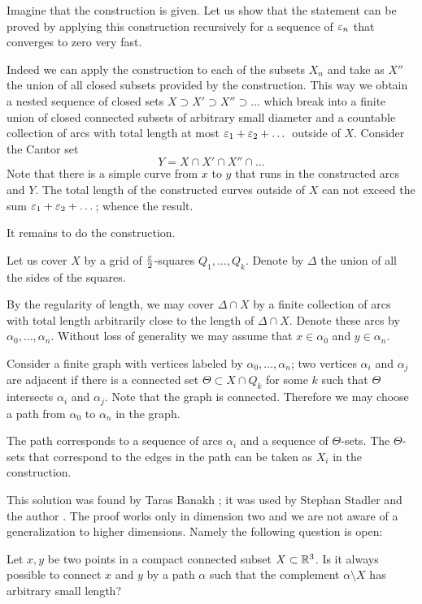Imagine that the construction is given.
Let us show that the statement can be proved by applying this construction recursively for a sequence of $\varepsilon_n$ that converges to zero very fast.

Indeed we can apply the construction to each of the subsets $X_n$ and take as $X''$ the union of all closed subsets provided by the construction.
This way we obtain a nested sequence of closed sets $X\supset X'\supset X''\supset\dots$ which break into a finite union of closed connected subsets of arbitrary small diameter and a countable collection of arcs with total length at most $\varepsilon_1+\varepsilon_2+\dots$ 
outside of $X$.
Consider the Cantor set 
\[Y= X\cap  X'\cap X''\cap\dots\]
Note that there is a simple curve from $x$ to $y$ that runs in the constructed arcs and $Y$.
The total length of the constructed curves outside of $X$ can not exceed the sum
$\varepsilon_1+\varepsilon_2+\dots$;
whence the result.

It remains to do the construction.

Let us cover $X$ by a grid of $\tfrac{\varepsilon}2$-squares $Q_1,\dots,Q_k$.
Denote by $\Delta$ the union of all the sides of the squares.

By the regularity of length, we may cover $\Delta\cap X$ by a finite collection of arcs with total length arbitrarily close to the length of $\Delta\cap X$.
Denote these arcs by $\alpha_0,\dots,\alpha_n$.
Without loss of generality we may assume that $x\in\alpha_0$ and $y\in\alpha_n$.

Consider a finite graph with vertices labeled by $\alpha_0,\dots,\alpha_n$;
two vertices $\alpha_i$ and $\alpha_j$ are adjacent if there is a connected set $\Theta\subset  X\cap Q_k$ 
for some $k$ such that $\Theta$ intersects $\alpha_i$ and $\alpha_j$.
Note that the graph is connected. Therefore we may choose a path from $\alpha_0$ to $\alpha_n$ in the graph.

The path corresponds to a sequence of arcs $\alpha_i$ and a sequence of $\Theta$-sets.
The $\Theta$-sets that correspond to the edges in the path can be taken as $ X_i$ in the construction.
\qeds

This solution was found by Taras Banakh \cite{banakh};
it was used by Stephan Stadler and the author \cite{petrunin-stadler:revisited}.
The proof works only in dimension two and we are not aware of a generalization to higher dimensions. 
Namely the following question is open:

\begin{pr}
Let $x,y$ be two points in a compact connected subset $X\subset \mathbb{R}^3$. 
Is it always possible to connect $x$ and $y$ by a path $\alpha$ such that the complement $\alpha\setminus X$ has arbitrary small length?
\end{pr}


